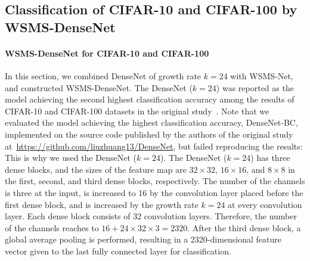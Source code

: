 \documentclass[journal]{IEEEtran}
\begin{document}
\subsection{Classification of CIFAR-10 and CIFAR-100 by WSMS-DenseNet}

\paragraph*{\textbf{WSMS-DenseNet for CIFAR-10 and CIFAR-100}}

In this section, we combined DenseNet of growth rate $k=24$ with WSMS-Net, and constructed WSMS-DenseNet.
The DenseNet ($k=24$) was reported as the model achieving the second highest classification accuracy among the results of CIFAR-10 and CIFAR-100 datasets in the original study~\cite{Huang2016b}.
Note that we evaluated the model achieving the highest classification accuracy, DenseNet-BC, implemented on the source code published by the authors of the original study at~\url{https://github.com/liuzhuang13/DenseNet}, but failed reproducing the results: This is why we used the DenseNet ($k=24$).
The DenseNet ($k=24$) has three dense blocks, and the sizes of the feature map are $32\times32$, $16\times16$, and $8\times8$ in the first, second, and third dense blocks, respectively.
The number of the channels is three at the input, is increased to 16 by the convolution layer placed before the first dense block, and is increased by the growth rate $k=24$ at every convolution layer.
Each dense block consists of 32 convolution layers.
Therefore, the number of the channels reaches to $16+24\times32\times3=2320$.
After the third dense block, a global average pooling is performed, resulting in a 2320-dimensional feature vector given to the last fully connected layer for classification.
\end{document}
